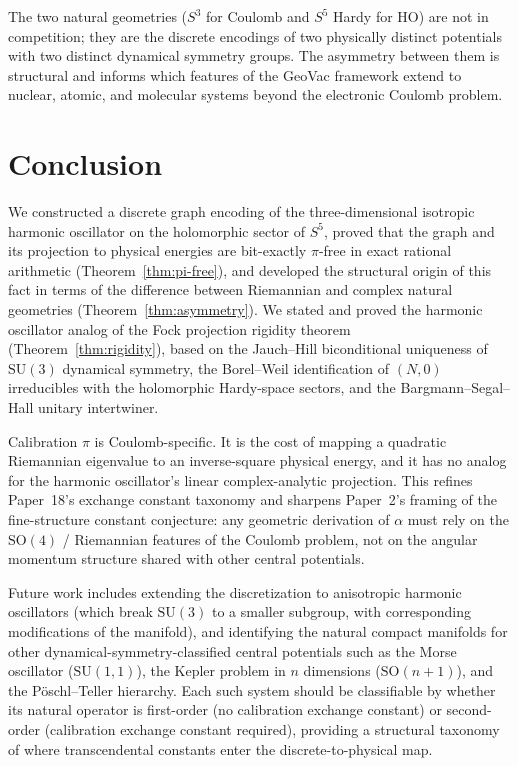\documentclass[twocolumn,pra,amsmath,amssymb,superscriptaddress]{revtex4-2}
\begin{document}
The two natural geometries ($S^3$ for Coulomb and $S^5$ Hardy
for HO) are not in competition; they are the discrete encodings
of two physically distinct potentials with two distinct
dynamical symmetry groups.  The asymmetry between them is
structural and informs which features of the GeoVac framework
extend to nuclear, atomic, and molecular systems beyond the
electronic Coulomb problem.

\section{Conclusion}
\label{sec:conclusion}

We constructed a discrete graph encoding of the three-dimensional
isotropic harmonic oscillator on the holomorphic sector of $S^5$,
proved that the graph and its projection to physical energies are
bit-exactly $\pi$-free in exact rational arithmetic
(Theorem~\ref{thm:pi-free}), and developed the structural origin
of this fact in terms of the difference between Riemannian and
complex natural geometries (Theorem~\ref{thm:asymmetry}).  We
stated and proved the harmonic oscillator analog of the Fock
projection rigidity theorem (Theorem~\ref{thm:rigidity}), based on
the Jauch--Hill biconditional uniqueness of $\mathrm{SU}(3)$
dynamical symmetry, the Borel--Weil identification of $(N, 0)$
irreducibles with the holomorphic Hardy-space sectors, and the
Bargmann--Segal--Hall unitary intertwiner.

Calibration $\pi$ is Coulomb-specific.  It is the cost of mapping
a quadratic Riemannian eigenvalue to an inverse-square physical
energy, and it has no analog for the harmonic oscillator's linear
complex-analytic projection.  This refines Paper~18's exchange
constant taxonomy and sharpens Paper~2's framing of the
fine-structure constant conjecture: any geometric derivation of
$\alpha$ must rely on the $\mathrm{SO}(4)$ / Riemannian features
of the Coulomb problem, not on the angular momentum structure
shared with other central potentials.

Future work includes extending the discretization to anisotropic
harmonic oscillators (which break $\mathrm{SU}(3)$ to a smaller
subgroup, with corresponding modifications of the manifold), and
identifying the natural compact manifolds for other
dynamical-symmetry-classified central potentials such as the
Morse oscillator ($\mathrm{SU}(1, 1)$), the Kepler problem in
$n$ dimensions ($\mathrm{SO}(n + 1)$), and the P\"oschl--Teller
hierarchy.  Each such system should be classifiable by whether
its natural operator is first-order (no calibration exchange
constant) or second-order (calibration exchange constant
required), providing a structural taxonomy of where transcendental
constants enter the discrete-to-physical map.
\end{document}

